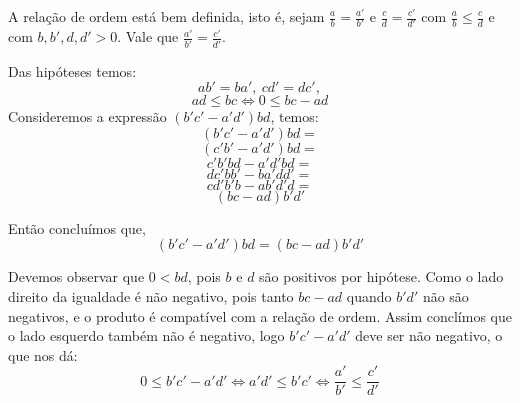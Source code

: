 \documentclass[../main.tex]{subfiles}
\begin{document}
\begin{prop}\label{rac-prop-relOrdemBemDef}
    A relação de ordem está bem definida, isto é, sejam $\frac{a}{b} = \frac{a'}{b'}$ e $\frac{c}{d} = \frac{c'}{d'}$ com 
    $\frac{a}{b} \leq \frac{c}{d}$ e com $b,b',d,d' > 0$. Vale que $\frac{a'}{b'} = \frac{c'}{d'}$.
\end{prop}
\begin{dem}
    Das hipóteses temos: \\
    \[ ab' = ba',\ cd' = dc', \] 
    \[ ad \leq bc \iff 0 \leq bc-ad \]
    Consideremos a expressão $(b'c'-a'd')bd$, temos: 
    \[ (b'c'-a'd')bd = \]
    \[ (c'b'-a'd')bd = \]
    \[ c'b'bd - a'd'bd = \]
    \[ dc'bb' - ba'dd' = \]
    \[ cd'b'b - ab'd'd = \]
    \[ (bc-ad) b'd' \]

    Então concluímos que, 
    \[ (b'c'-a'd')bd = (bc-ad) b'd' \]

    Devemos observar que $0 < bd$, pois $b$ e $d$ são positivos por hipótese. Como o lado direito da igualdade é não negativo, pois 
    tanto $bc-ad$ quando $b'd'$ não são negativos, e o produto é compatível com a relação de ordem. Assim conclímos que o lado esquerdo também não é negativo, logo $b'c'-a'd'$ deve ser não negativo, o que nos dá:
    \[ 0 \leq b'c'-a'd' \iff a'd' \leq b'c' \iff \frac{a'}{b'} \leq \frac{c'}{d'}\]

    
    
    
\end{dem}
\end{document}
